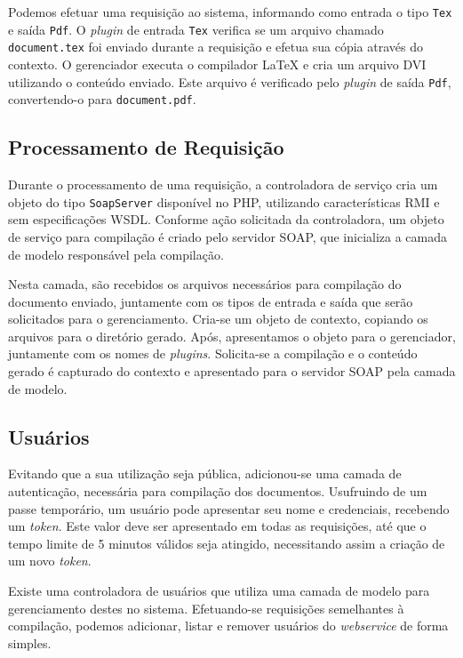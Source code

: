 \documentclass{article}
\begin{document}
Podemos efetuar uma requisição ao sistema, informando como entrada o tipo
\texttt{Tex} e saída \texttt{Pdf}. O \emph{plugin} de entrada \texttt{Tex}
verifica se um arquivo chamado \texttt{document.tex} foi enviado durante a
requisição e efetua sua cópia através do contexto. O gerenciador executa o
compilador \LaTeX{} e cria um arquivo DVI utilizando o conteúdo enviado. Este
arquivo é verificado pelo \emph{plugin} de saída \texttt{Pdf}, convertendo-o
para \texttt{document.pdf}.

\subsection{Processamento de Requisição}

Durante o processamento de uma requisição, a controladora de serviço cria um
objeto do tipo \texttt{SoapServer} disponível no PHP, utilizando características
RMI e sem especificações WSDL. Conforme ação solicitada da controladora, um
objeto de serviço para compilação é criado pelo servidor SOAP, que inicializa a
camada de modelo responsável pela compilação.

Nesta camada, são recebidos os arquivos necessários para compilação do documento
enviado, juntamente com os tipos de entrada e saída que serão solicitados para o
gerenciamento. Cria-se um objeto de contexto, copiando os arquivos para o
diretório gerado. Após, apresentamos o objeto para o gerenciador, juntamente com
os nomes de \emph{plugins}. Solicita-se a compilação e o conteúdo gerado é
capturado do contexto e apresentado para o servidor SOAP pela camada de modelo.

\subsection{Usuários}

Evitando que a sua utilização seja pública, adicionou-se uma camada de
autenticação, necessária para compilação dos documentos. Usufruindo de um passe
temporário, um usuário pode apresentar seu nome e credenciais, recebendo um
\emph{token}. Este valor deve ser apresentado em todas as requisições, até que o
tempo limite de 5 minutos válidos seja atingido, necessitando assim a criação de
um novo \emph{token}.

Existe uma controladora de usuários que utiliza uma camada de modelo para
gerenciamento destes no sistema. Efetuando-se requisições semelhantes à
compilação, podemos adicionar, listar e remover usuários do \emph{webservice} de
forma simples.
\end{document}
